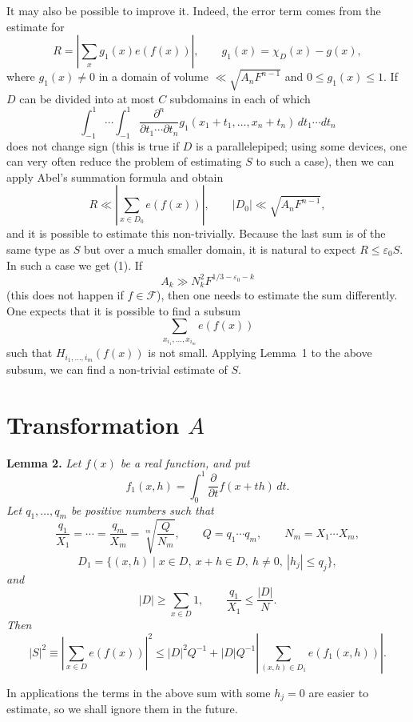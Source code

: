 \documentclass[10pt]{article}
\begin{document}
It may also be possible to improve it. Indeed, the error term comes from the estimate for
\[
  R=\left|\sum_xg_1(x)e(f(x))\right|,
  \qquad g_1(x)=\chi_D(x)-g(x),
\]
where $g_1(x)\ne0$ in a domain of volume $\ll\sqrt{A_nF^{n-1}}$ and $0\leqslant g_1(x)\leqslant1$. If $D$ can be divided into at most $C$ subdomains in each of which
\[
  \int_{-1}^{1}\cdots\int_{-1}^{1}
  \frac{\partial^n}{\partial t_1\cdots\partial t_n}
  g_1(x_1+t_1,\ldots,x_n+t_n)\,dt_1\cdots dt_n
\]
does not change sign (this is true if $D$ is a parallelepiped; using some devices, one can very often reduce the problem of estimating $S$ to such a case), then we can apply Abel's summation formula and obtain
\[
  R\ll\left|\sum_{x\in D_0}e(f(x))\right|,
  \qquad |D_0|\ll\sqrt{A_nF^{n-1}},
\]
and it is possible to estimate this non-trivially. Because the last sum is of the same type as $S$ but over a much smaller domain, it is natural to expect $R\leqslant\varepsilon_0S$. In such a case we get (1). If
\[
  A_k\gg N_k^2F^{1/3-\varepsilon_0-k}
\]
(this does not happen if $f\in\mathscr F$), then one needs to estimate the sum differently. One expects that it is possible to find a subsum
\[
  \sum_{x_{i_1},\ldots,x_{i_m}}e(f(x))
\]
such that $H_{i_1,\ldots,i_m}(f(x))$ is not small. Applying Lemma~1 to the above subsum, we can find a non-trivial estimate of $S$.

\section{Transformation $A$}

\medskip
\noindent\textbf{Lemma 2.}
\textit{Let $f(x)$ be a real function, and put
\[
  f_1(x,h)=\int_0^1\frac{\partial}{\partial t}f(x+th)\,dt.
\]
Let $q_1,\ldots,q_m$ be positive numbers such that
\[
  \frac{q_1}{X_1}=\cdots=\frac{q_m}{X_m}=\sqrt[m]{\frac Q{N_m}},
  \qquad Q=q_1\cdots q_m,
  \qquad N_m=X_1\cdots X_m,
\]
\[
  D_1=\{(x,h)\mid x\in D,\ x+h\in D,\ h\ne0,\ |h_j|\leqslant q_j\},
\]
and
\[
  |D|\geqslant\sum_{x\in D}1,
  \qquad \frac{q_1}{X_1}\leqslant\frac{|D|}{N}.
\]
Then
\[
  |S|^2\equiv\left|\sum_{x\in D}e(f(x))\right|^2
  \leqslant |D|^2Q^{-1}+|D|Q^{-1}
  \left|\sum_{(x,h)\in D_1}e(f_1(x,h))\right|.
\]}

In applications the terms in the above sum with some $h_j=0$ are easier to estimate, so we shall ignore them in the future.
\end{document}
